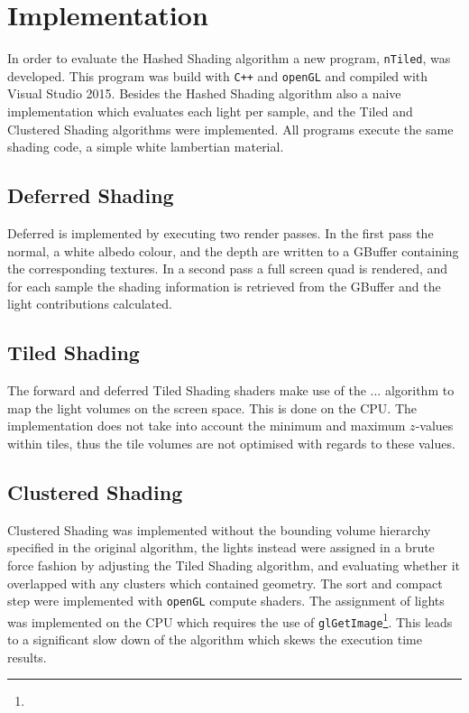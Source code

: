 \section{Implementation}

In order to evaluate the Hashed Shading algorithm a new program, \texttt{nTiled},
was developed. This program was build with \texttt{C++} and \texttt{openGL} and
compiled with Visual Studio 2015. 
Besides the Hashed Shading algorithm also a naive implementation which evaluates each
light per sample, and the Tiled and Clustered Shading algorithms were implemented.
All programs execute the same shading code, a simple white lambertian material.

\subsection{Deferred Shading}

Deferred is implemented by executing two render passes. In the first pass
the normal, a white albedo colour, and the depth are written to a GBuffer containing
the corresponding textures. In a second pass a full screen quad is rendered, and for
each sample the shading information is retrieved from the GBuffer and the
light contributions calculated.

\subsection{Tiled Shading}

The forward and deferred Tiled Shading shaders make use of the ... algorithm to
map the light volumes on the screen space. This is done on the CPU. The implementation
does not take into account the minimum and maximum $z$-values within tiles, thus
the tile volumes are not optimised with regards to these values.

\subsection{Clustered Shading}

Clustered Shading was implemented without the bounding volume hierarchy specified in
the original algorithm, the lights instead were assigned in a brute force fashion by
adjusting the Tiled Shading algorithm, and evaluating whether it overlapped with any
clusters which contained geometry. The sort and compact step were implemented with
\texttt{openGL} compute shaders. The assignment of lights was implemented on the CPU
which requires the use of \texttt{glGetImage}\footnote{}. This leads to a significant
slow down of the algorithm which skews the execution time results.

